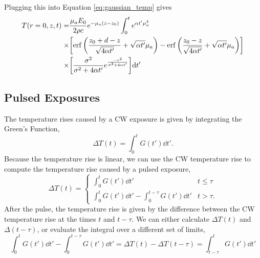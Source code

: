 \documentclass[]{article}
\begin{document}
Plugging this into Equation \ref{eq:gaussian_temp} gives
\begin{align}
  \label{eq:gaussian_off_axis_temp}
  T(r=0, z,t) =& \frac{\mu_aE_0}{2\rho c}e^{-\mu_a (z-z_0)} \int_0^t e^{\alpha t'\mu_a^2}  \nonumber \\
  \times & \qty[\erf\qty(\frac{z_0 + d - z}{\sqrt{4\alpha t'}} + \sqrt{\alpha t'}\mu_a ) - \erf\qty(\frac{z_0 - z}{\sqrt{4\alpha t'}} + \sqrt{\alpha t'}\mu_a ) ] \nonumber \\
  \times & \qty[
  \frac{\sigma^2}{\sigma^2 + 4\alpha t'}
  e^{\frac{-r^2}{\sigma^2 + 4\alpha t'}  }
  ]
  \dd t'
\end{align}



\subsection{Pulsed Exposures}

The temperature rises caused by a CW exposure is given by integrating the Green's Function,
\begin{equation}
  \Delta T(t) = \int_{0}^{t} G(t') \dd t'.
\end{equation}
Because the temperature rise is linear, we can use the CW temperature rise to compute
the temperature rise caused by a pulsed exposure,
\begin{equation}
  \Delta T(t) = \begin{cases}
    \int_{0}^{t} G(t') \dd t' & t \le \tau \\
    \int_{0}^{t} G(t') \dd t' - \int_{0}^{t-\tau} G(t') \dd t' & t > \tau.
\end{cases}
\end{equation}
After the pulse, the temperature rise is given by the difference between the CW temperature rise at the times $t$ and $t-\tau$.
We can either calculate $\Delta T(t)$ and $\Delta(t-\tau)$, or evaluate the integral over a different set of limits,
\begin{equation}
    \int_{0}^{t} G(t') \dd t' - \int_{0}^{t-\tau} G(t') \dd t'  = \Delta T(t) - \Delta T(t-\tau) = \int_{t-\tau}^{t} G(t') \dd t'
\end{equation}
\end{document}
